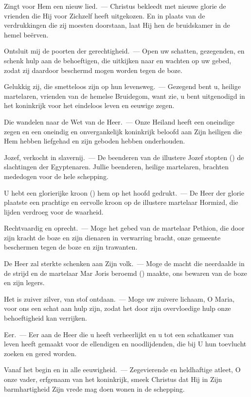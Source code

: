 \documentclass[12pt,twoside,a5paper]{article}
\begin{document}
\begin{halfparskip}
  Zingt voor Hem een nieuw lied.~--- Christus bekleedt met nieuwe glorie de vrienden die Hij voor Zichzelf heeft uitgekozen. En in plaats van de verdrukkingen die zij moesten doorstaan, laat Hij hen de bruidskamer in de hemel beërven.

  Ontsluit mij de poorten der gerechtigheid.~--- Open uw schatten, gezegenden, en schenk hulp aan de behoeftigen, die uitkijken naar en wachten op uw gebed, zodat zij daardoor beschermd mogen worden tegen de boze.

  Gelukkig zij, die smetteloos zijn op hun levensweg.~--- Gezegend bent u, heilige martelaren, vrienden van de hemelse Bruidegom, want zie, u bent uitgenodigd in het koninkrijk voor het eindeloos leven en eeuwige zegen.

  Die wandelen naar de Wet van de Heer.~--- Onze Heiland heeft een oneindige zegen en een oneindig en onvergankelijk koninkrijk beloofd aan Zijn heiligen die Hem hebben liefgehad en zijn geboden hebben onderhouden.

  Jozef, verkocht in slavernij.~--- De beenderen van de illustere Jozef stopten () de slachtingen der Egyptenaren. Jullie beenderen, heilige martelaren, brachten mededogen voor de hele schepping.

  U hebt een glorierijke kroon () hem op het hoofd gedrukt.~--- De Heer der glorie plaatste een prachtige en eervolle kroon op de illustere martelaar Hormizd, die lijden verdroeg voor de waarheid.

  Rechtvaardig en oprecht.~--- Moge het gebed van de martelaar Pethion, die door zijn kracht de boze en zijn dienaren in verwarring bracht, onze gemeente beschermen tegen de boze en zijn trawanten.

  De Heer zal sterkte schenken aan Zijn volk.~--- Moge de macht die neerdaalde in de strijd en de martelaar Mar Joris beroemd () maakte, ons bewaren van de boze en zijn legers.

  Het is zuiver zilver, van stof ontdaan.~--- Moge uw zuivere lichaam, O Maria, voor ons een schat aan hulp zijn, zodat het door zijn overvloedige hulp onze behoeftigheid kan verrijken.

  Eer.~--- Eer aan de Heer die u heeft verheerlijkt en u tot een schatkamer van leven heeft gemaakt voor de ellendigen en noodlijdenden, die bij U hun toevlucht zoeken en gered worden.

  Vanaf het begin en in alle eeuwigheid.~--- Zegevierende en heldhaftige atleet, O onze vader, erfgenaam van het koninkrijk, smeek Christus dat Hij in Zijn barmhartigheid Zijn vrede mag doen wonen in de schepping.


\end{halfparskip}
\end{document}

